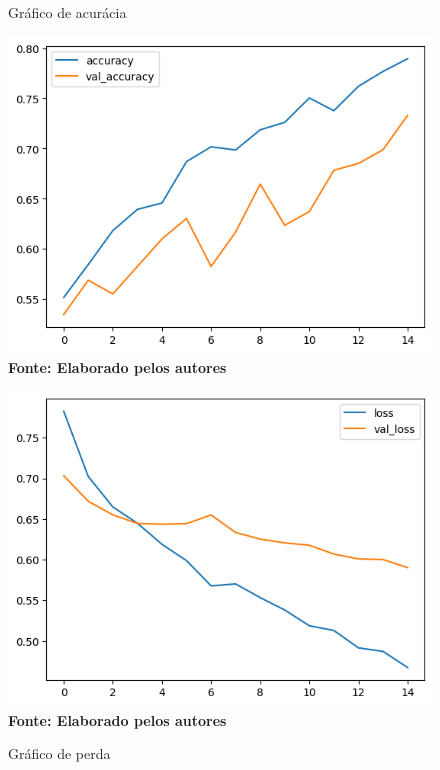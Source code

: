 \begin{figure}[ht]
\centering
\begin{minipage}{0.45\textwidth}
  \centering
  \caption[\hspace{0.1cm}Grade Computacional.]{Gráfico de acurácia}
  \vspace{-0.4cm}
  \includegraphics[width=\linewidth]{figuras/accuracy.png}
  \captionsetup{justification=centering}
  \vspace{-0.2cm}
  \\\textbf{\footnotesize Fonte: Elaborado pelos autores}
  \label{fig:acc}
\end{minipage}\hfill
\begin{minipage}{0.45\textwidth}
  \centering
  \caption[\hspace{0.1cm}Grade Computacional.]{Gráfico de perda}
  \vspace{-0.4cm}
  \includegraphics[width=\linewidth]{figuras/loss.png}
  \captionsetup{justification=centering}
  \vspace{-0.2cm}
  \\\textbf{\footnotesize Fonte: Elaborado pelos autores}
  \label{fig:loss}
\end{minipage}
\end{figure}



